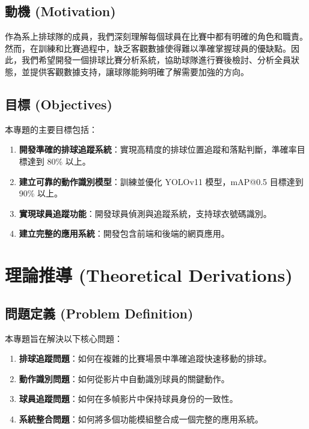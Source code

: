 \documentclass[a4paper,14pt,oneside]{article}
\begin{document}
\subsection{動機 (Motivation)}
作為系上排球隊的成員，我們深刻理解每個球員在比賽中都有明確的角色和職責。然而，在訓練和比賽過程中，缺乏客觀數據使得難以準確掌握球員的優缺點。因此，我們希望開發一個排球比賽分析系統，協助球隊進行賽後檢討、分析全員狀態，並提供客觀數據支持，讓球隊能夠明確了解需要加強的方向。

\subsection{目標 (Objectives)}
本專題的主要目標包括：

\begin{enumerate}
    \item \textbf{開發準確的排球追蹤系統}：實現高精度的排球位置追蹤和落點判斷，準確率目標達到 80\% 以上。
    
    \item \textbf{建立可靠的動作識別模型}：訓練並優化 YOLOv11 模型，mAP@0.5 目標達到 90\% 以上。
    
    \item \textbf{實現球員追蹤功能}：開發球員偵測與追蹤系統，支持球衣號碼識別。
    
    \item \textbf{建立完整的應用系統}：開發包含前端和後端的網頁應用。
\end{enumerate}

\newpage
\section{理論推導 (Theoretical Derivations)}

\subsection{問題定義 (Problem Definition)}
本專題旨在解決以下核心問題：

\begin{enumerate}
    \item \textbf{排球追蹤問題}：如何在複雜的比賽場景中準確追蹤快速移動的排球。
    \item \textbf{動作識別問題}：如何從影片中自動識別球員的關鍵動作。
    \item \textbf{球員追蹤問題}：如何在多幀影片中保持球員身份的一致性。
    \item \textbf{系統整合問題}：如何將多個功能模組整合成一個完整的應用系統。
\end{enumerate}
\end{document}
